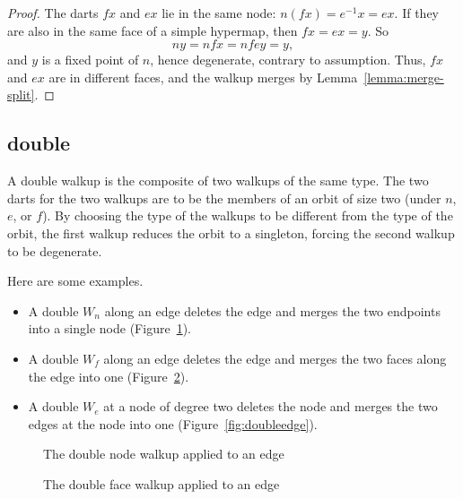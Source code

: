 \begin{proof} 
The darts $f x$ and $e x$ lie in the same node: $n (f x) = e^{-1} x
= e x$. If they are also in the same face of a simple hypermap, then
$f x = e x = y$. So
\begin{displaymath}n y  = n f x = n f e y = y,\end{displaymath}
and $y$ is a fixed
point of $n$, hence degenerate, contrary to assumption.  
Thus, $f x$ and $e x$ are in different faces, and the walkup merges
by Lemma~\ref{lemma:merge-split}.  
\end{proof}


\subsection{double}
%

A double walkup is the composite of two walkups of the same type.  The
two darts for the two walkups are to be the members of an orbit of
size two (under $n$, $e$, or $f$).
By choosing the type of the walkups to be different from the type of
the orbit, the first walkup reduces the orbit to a singleton, forcing
the second walkup to be degenerate.

Here are some examples.
\begin{itemize}
\item A double $W_n$ along an edge deletes the edge and 
merges the two endpoints into
a single node (Figure~\ref{fig:doublenode}). 
\item A double $W_f$ along an edge 
deletes the edge and merges the two faces along the edge into
one (Figure~\ref{fig:doubleface}).
\item A double $W_e$ at a node of degree two
deletes the node and merges the two edges at the node into
one (Figure~\ref{fig:doubleedge}).
\end{itemize}


\begin{figure}[htb]
\centering
{}
\caption{The double node walkup applied to an edge}
\label{fig:doublenode}
\end{figure}


\begin{figure}[htb]
\centering
{}
\caption{The double face walkup applied to an edge}
\label{fig:doubleface}
\end{figure}


